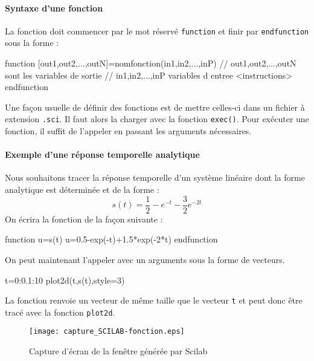 \paragraph{Syntaxe d'une fonction}
La fonction doit commencer par le mot réservé \verb?function? et finir par 
\verb?endfunction? sous la forme :
\begin{Scilabcode}
function [out1,out2,...,outN]=nomfonction(in1,in2,...,inP)
    // out1,out2,...,outN sont les variables de sortie
    // in1,in2,...,inP variables d entree
    <instructions>
endfunction
\end{Scilabcode}
Une façon usuelle de définir des fonctions est de mettre 
celles-ci dans un fichier à extension \verb?.sci?. 
Il faut alors la charger avec la fonction \verb?exec()?.
Pour exécuter une fonction, il suffit de l'appeler en passant les 
arguments nécessaires.
\paragraph{Exemple d'une réponse temporelle analytique}
Nous souhaitons tracer la réponse temporelle d'un système linéaire dont la
forme analytique est déterminée et de la forme :
\[
s(t)=\dfrac{1}{2}-e^{-t}-\dfrac{3}{2}e^{-2t}
\]
On écrira la fonction de la façon suivante :
\begin{Scilabcode}
function u=s(t)
    u=0.5-exp(-t)+1.5*exp(-2*t)
endfunction
\end{Scilabcode}
On peut maintenant l'appeler avec un arguments sous la forme de vecteurs. 
\begin{Scilabcode}
t=0:0.1:10
plot2d(t,s(t),style=3)
\end{Scilabcode}
La fonction renvoie un vecteur de même taille que le vecteur \verb?t? et peut
donc être tracé avec la fonction \verb?plot2d?.
\begin{figure}[!hb]
    \centering
    \texttt{[image: capture\_SCILAB-fonction.eps]}
    \caption{Capture d'écran de la fenêtre générée par Scilab}
\end{figure}
\newpage

